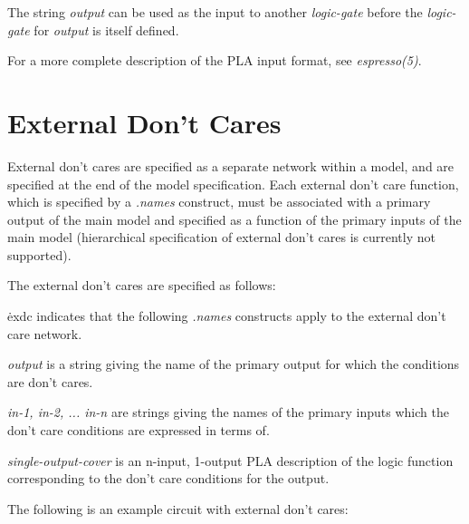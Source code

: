 {\begin{pespace}
The string {\em output} can be used as the input to another {\em logic-gate}
before the {\em logic-gate} for {\em output} is itself defined.  

For a more complete description of the PLA input format, see {\em
espresso(5)}.

\section{External Don't Cares}

External don't cares are specified as a separate network within
a model, and are specified at the end of the model specification.
Each external don't care function, which is specified by a {\em .names}
construct, must be associated with a primary
output of the main model and specified as a function
of the primary inputs of the main model (hierarchical specification
of external don't cares is currently not supported).

The external don't cares are specified as follows:

\begin{description}
\item {\.exdc} indicates that the following {\em .names} constructs
apply to the external don't care network.
\item {\em output} is a string giving the name of the primary output for
which the conditions are don't cares.

\item {\em in-1, in-2, ... in-n} are strings giving the names of the primary
inputs which the don't care conditions are expressed in terms of.

\item {\em single-output-cover} is an n-input, 1-output PLA
description of the logic function corresponding to the don't care
conditions for the output.
\end{description}

The following is an example circuit with external don't cares:


\end{pespace}}

